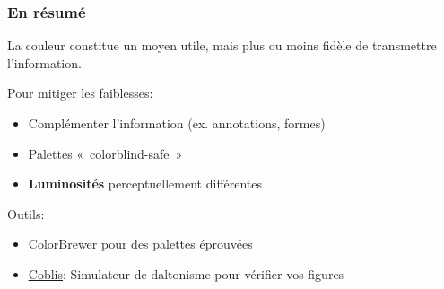 \documentclass[aspectratio=169]{beamer}
\begin{document}
    


    



\begin{frame}[c]\frametitle{En résumé}

La couleur constitue un moyen utile, mais plus ou moins fidèle de transmettre l'information.

Pour mitiger les faiblesses:\vspace{-\parskip}
\begin{itemize}
	\item Complémenter l'information (ex. annotations, formes)
	\item Palettes «~colorblind-safe~»
	\item \textbf{Luminosités} perceptuellement différentes
\end{itemize}

Outils:\vspace{-\parskip}
\begin{itemize}
	\item \href{https://colorbrewer2.org/}{\underline{ColorBrewer}} pour des palettes éprouvées
	\item \href{https://www.color-blindness.com/coblis-color-blindness-simulator/}{\underline{Coblis}}: Simulateur de daltonisme pour vérifier vos figures 
\end{itemize}

\end{frame}
\end{document}
